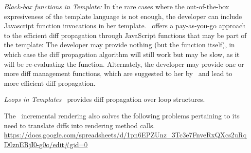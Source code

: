 \begin{compact_item}
\begin{compact_enum}
\item \textit{Black-box functions in Template:} In the rare cases where the out-of-the-box expresiveness of the template language is not enough, the developer can include Javascript function invocations in her template. \projname\ offers a pay-as-you-go approach to the efficient diff propagation through JavaScript functions that may be part of the template: The developer may provide nothing (but the function itself), in which case the diff propagation algorithm will still work but may be slow, as it will be re-evaluating the function. Alternately, the developer may provide one or more diff management functions, which are suggested to her by \projname\ and lead to more efficient diff propagation.  
%

\item \textit{Loops in Templates} \projname\ provides diff propagation over loop structures.  

% 
\end{compact_enum}
%
The \projname\ incremental rendering also solves the following problems pertaining to its need to translate diffs into rendering method calls.   \url{https://docs.google.com/spreadsheets/d/1pn6EPZUnz\_3Tc3e7FnveRxQXcs2uRqD0znERjI0-g0o/edit#gid=0}
\begin{compact_enum}


\end{compact_enum}
\end{compact_item}
